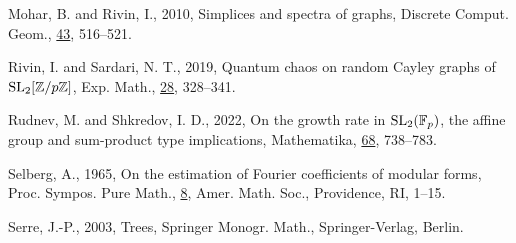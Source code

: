 \documentclass[11pt]{amsart}
\theoremstyle{definition}
\theoremstyle{remark}
\theoremstyle{plain}
\numberwithin{equation}{section}
\numberwithin{lemma}{section}
\numberwithin{definition}{section}
\numberwithin{proposition}{section}
\numberwithin{corollary}{section}
\numberwithin{theorem}{section}
\numberwithin{remark}{section}
\begin{document}
\begin{thebibliography}{10}
Mohar, B. and Rivin, I., 2010, Simplices and spectra of graphs, Discrete Comput.
Geom., \underline{43}, 516--521.

Rivin, I. and Sardari, N. T., 2019, Quantum chaos on random Cayley graphs of
\({\rm SL}_2[\mathbb Z/p\mathbb Z]\), Exp. Math., \underline{28}, 328--341.

Rudnev, M. and Shkredov, I. D., 2022, On the growth rate in
\({\rm SL}_2(\mathbb F_p)\), the affine group and sum-product type implications,
Mathematika, \underline{68}, 738--783.

Selberg, A., 1965, On the estimation of Fourier coefficients of modular forms,
Proc. Sympos. Pure Math., \underline{8}, Amer. Math. Soc., Providence, RI,
1--15.

Serre, J.-P., 2003, Trees, Springer Monogr. Math., Springer-Verlag, Berlin.

\end{thebibliography}

%
\end{document}
